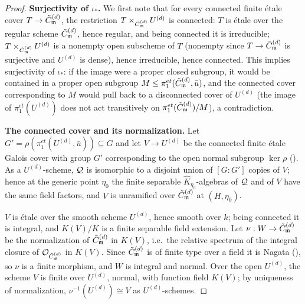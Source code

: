 \begin{proof}
    \textbf{Surjectivity of $\iota_*$.}
    We first note that for every connected finite \'etale cover $T \to \tilde{C}_{\mathfrak{m}}^{(d)}$, the restriction
    $T \times_{\tilde{C}_{\mathfrak{m}}^{(d)}} U^{(d)}$ is connected: $T$ is \'etale over the regular scheme $\tilde{C}_{\mathfrak{m}}^{(d)}$, hence
    regular, and being connected it is irreducible; $T \times_{\tilde{C}_{\mathfrak{m}}^{(d)}} U^{(d)}$ is a nonempty open
    subscheme of $T$ (nonempty since $T \to \tilde{C}_{\mathfrak{m}}^{(d)}$ is surjective and $U^{(d)}$ is dense), hence
    irreducible, hence connected.
    This implies surjectivity of $\iota_*$: if the image were a proper closed subgroup, it would be
    contained in a proper open subgroup $M \leq \pi_1^{et}(\tilde{C}_{\mathfrak{m}}^{(d)}, \bar{u})$, and the connected cover
    corresponding to $M$ would pull back to a disconnected cover of $U^{(d)}$ (the image of
    $\pi_1^{et}(U^{(d)})$ does not act transitively on $\pi_1^{et}(\tilde{C}_{\mathfrak{m}}^{(d)})/M$), a contradiction.

    \textbf{The connected cover and its normalization.}
    Let $G' = \rho\left(\pi_1^{et}(U^{(d)}, \bar{u})\right) \subseteq G$ and let $V \to U^{(d)}$ be the connected
    finite \'etale Galois cover with group $G'$ corresponding to the open normal subgroup
    $\ker \rho$ (). As a $U^{(d)}$-scheme, $\mathcal{Q}$ is
    isomorphic to a disjoint union of $[G : G']$ copies of $V$; hence at the generic point $\eta_0$ the
    finite separable $\widehat{K}_{\eta_0}$-algebras of $\mathcal{Q}$ and of $V$ have the same field factors, and
    $V$ is unramified over $\tilde{C}_{\mathfrak{m}}^{(d)}$ at $(H, \eta_0)$.

    $V$ is \'etale over the smooth scheme $U^{(d)}$, hence smooth over $k$; being connected it is
    integral, and $K(V)/K$ is a finite separable field extension. Let
    $\nu : W \to \tilde{C}_{\mathfrak{m}}^{(d)}$ be the normalization of $\tilde{C}_{\mathfrak{m}}^{(d)}$ in $K(V)$, i.e.\ the relative spectrum of
    the integral closure of $\mathcal{O}_{\tilde{C}_{\mathfrak{m}}^{(d)}}$ in $K(V)$. Since $\tilde{C}_{\mathfrak{m}}^{(d)}$ is of finite type over a field it
    is Nagata (), so $\nu$ is a finite morphism, and $W$ is integral and normal.
    Over the open $U^{(d)}$, the scheme $V$ is finite over $U^{(d)}$, normal, with function field $K(V)$;
    by uniqueness of normalization, $\nu^{-1}(U^{(d)}) \cong V$ as $U^{(d)}$-schemes.


\end{proof}
